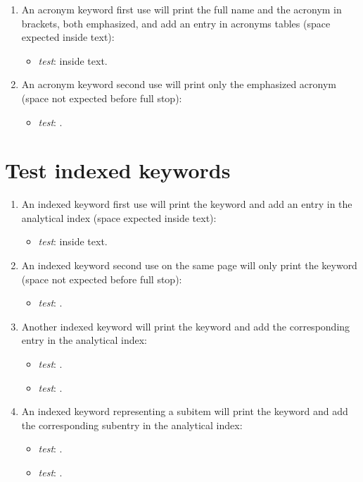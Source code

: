 \begin{enumerate}

\item An acronym keyword first use will print the full name and the acronym in brackets, both emphasized, and add an entry in acronyms tables (space expected inside text):
\begin{itemize}
\item \textit{test}: \AKE inside text.
\end{itemize}

\item An acronym keyword second use will print only the emphasized acronym (space not expected before full stop): 
\begin{itemize}
\item \textit{test}: \AKE.
\end{itemize}

\end{enumerate}

\section{Test indexed keywords}

\begin{enumerate}

\item An indexed keyword first use will print the keyword and add an entry in the analytical index (space expected inside text):
\begin{itemize}
\item \textit{test}: \idxKeyOne inside text.
\end{itemize}

\item An indexed keyword second use on the same page will only print the keyword (space not expected before full stop): 
\begin{itemize}
\item \textit{test}: \idxKeyOne.
\end{itemize}

\item Another indexed keyword will print the keyword and add the corresponding entry in the analytical index: 
\begin{itemize}
\item \textit{test}: \idxKeyTwo.
\item \textit{test}: \idxKeyThree.
\end{itemize}

\item An indexed keyword representing a subitem will print the keyword and add the corresponding subentry in the analytical index: 
\begin{itemize}
\item \textit{test}: \idxKeyTwoSub.
\item \textit{test}: \idxKeyThreeSubsub.
\end{itemize}

\end{enumerate}

